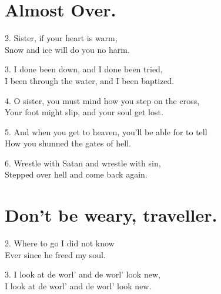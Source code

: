 \documentclass[a5paper,10pt]{book}
\begin{document}
\begin{extra}
\end{extra}

\newpage
\section{Almost Over.}
\thispagestyle{empty}

\begin{song}
\end{song}

\begin{stanza}
\item[2.]
  Sister, if your heart is warm,\\
  Snow and ice will do you no harm.
\item[3.]
  I done been down, and I done been tried,\\
  I been through the water, and I been baptized.
\item[4.]
  O sister, you must mind how you step on the cross,\\
  Your foot might slip, and your soul get lost.
\item[5.]
  And when you get to heaven, you'll be able for to tell\\
  How you shunned the gates of hell.
\item[6.]
  Wrestle with Satan and wrestle with sin,\\
  Stepped over hell and come back again.
\end{stanza}

\begin{extra}
\end{extra}


\newpage
\section{Don't be weary, traveller.}
\thispagestyle{empty}

\begin{song}
\end{song}

\begin{stanza}
\item[2.]
  Where to go I did not know\\
  Ever since he freed my soul.
\item[3.]
  I look at de worl' and de worl' look new,\\
  I look at de worl' and de worl' look new.
\end{stanza}
\end{document}
